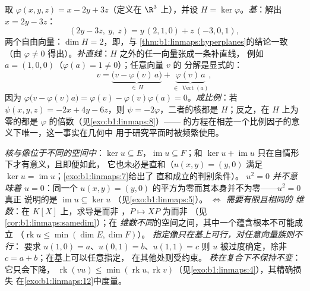 \begin{example}[同一超平面的三种处理]
\label{ex:b1:linmaps:hyperplanerun}
取 $\varphi(x, y, z) = x - 2y + 3z$（定义在 $\R^3$ 上），并设 $H =
\ker\varphi$。\emph{基}：解出 $x = 2y - 3z$：
\[
(2y - 3z,\ y,\ z) = y\,(2, 1, 0) + z\,(-3, 0, 1),
\]
两个自由向量：$\dim H = 2$，即，与
\cref{thm:b1:linmaps:hyperplanes}的结论一致（由 $\varphi \neq
0$ 得出）。\emph{补直线}：$H$ 之外的任一向量张成一条补直线，
例如 $a = (1, 0, 0)$（$\varphi(a) = 1 \neq 0$）；任意向量 $v$ 的
分解是显式的：
\[
v = \underbrace{\bigl(v - \varphi(v)\,a\bigr)}_{\in\,H}
+ \underbrace{\varphi(v)\,a}_{\in\,\operatorname{Vect}(a)},
\]
因为 $\varphi\bigl(v - \varphi(v)a\bigr) = \varphi(v) -
\varphi(v)\varphi(a) = 0$。\emph{成比例}：若 $\psi(x,y,z)
= -2x + 4y - 6z$，则 $\psi = -2\varphi$，二者的核都是
$H$；反之，在 $H$ 上为零的都是
$\varphi$ 的倍数（见\cref{exo:b1:linmaps:8}）——
的方程在相差一个比例因子的意义下唯一，这一事实在几何中
用于研究平面时被频繁使用。
\end{example}

\begin{remark}[常见误区]
\label{rem:b1:linmaps:pitfalls}
\emph{核与像位于不同的空间中}：$\ker u
\subseteq E$，$\operatorname{im} u \subseteq F$；和 $\ker u
+ \operatorname{im} u$ 只在自情形下才有意义，且即便如此，
它也未必是直和（$u(x, y) = (y, 0)$ 满足 $\ker u
= \operatorname{im} u$；\cref{exo:b1:linmaps:7}给出了
直和成立的判别条件）。
\emph{$u^2 = 0$ 并不意味着 $u = 0$}：同一个 $u(x,y) =
(y, 0)$ 的平方为零而其本身并不为零——$u^2 = 0$ 真正
说明的是 $\operatorname{im} u \subseteq \ker u$
（见\cref{exo:b1:linmaps:5}）。
\emph{ $\iff$ 需要有限且相同的
维数}：在 $K[X]$ 上，求导是而非
，$P \mapsto XP$ 为而非
（见\cref{cor:b1:linmaps:samedim}）；在
\emph{维数不同}的空间之间，其中一个蕴含根本不可能成立
（$\operatorname{rk} u \leq \min(\dim E, \dim F)$）。
\emph{指定像只在基上可行，对任意向量族则不行}：
要求 $u(1, 0) = a$、$u(0, 1) = b$、$u(1, 1) = c$
则 $u$ 被过度确定，除非 $c = a + b$；在基上可以任意指定，
在其他处则受约束。
\emph{秩在复合下不保持不变}：它只会下降，
$\operatorname{rk}(vu) \leq \min(\operatorname{rk} u,
\operatorname{rk} v)$（见\cref{exo:b1:linmaps:4}），其精确损失
在\cref{exo:b1:linmaps:12}中度量。
\end{remark}

